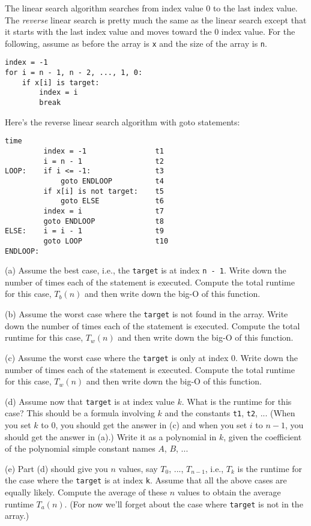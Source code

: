 The linear search algorithm searches from index value 0 to the
last index value.
The \textit{reverse} linear search is pretty much the same as the linear
search except that it starts with the last index value and moves
toward the 0 index value.
For the following, assume as before the array is \verb!x!
and the size of the array is \verb!n!. 
\begin{Verbatim}[frame=single, fontsize=\footnotesize]
index = -1
for i = n - 1, n - 2, ..., 1, 0:
    if x[i] is target:
        index = i
        break
\end{Verbatim}
Here's the reverse linear search algorithm with goto statements:
\begin{Verbatim}[frame=single, fontsize=\footnotesize]
                                   time      
         index = -1                t1     
         i = n - 1                 t2     
LOOP:    if i <= -1:               t3      
             goto ENDLOOP          t4     
         if x[i] is not target:    t5        
             goto ELSE             t6      
         index = i                 t7     
         goto ENDLOOP              t8     
ELSE:    i = i - 1                 t9     
         goto LOOP                 t10    
ENDLOOP:
\end{Verbatim}

(a) Assume the best case, i.e., the \verb!target! is at index 
\verb!n - 1!.
Write down the number of times each of the statement is executed.
Compute the total runtime for this case, $T_b(n)$ and then
write down the big-O of this function.

(b) Assume the worst case where the \verb!target! is not found in the 
array.
Write down the number of times each of the statement is executed.
Compute the total runtime for this case, $T_w(n)$ and then
write down the big-O of this function.

(c) Assume the worst case where the \verb!target! is only at index 0.
Write down the number of times each of the statement is executed.
Compute the total runtime for this case, $T_w(n)$ and then
write down the big-O of this function.

(d) Assume now that \verb!target! is at index value $k$.
What is the runtime for this case? 
This should be a formula involving $k$ and the constants 
\verb!t1!, \verb!t2!, ...
(When you set $k$ to $0$, you should get the answer in (c)
and when you set $i$ to $n - 1$, you should get the answer in (a).)
Write it as a polynomial in $k$, given the coefficient of the polynomial
simple constant names $A$, $B$, ...

(e) Part (d) should give you $n$ values, say $T_0$, ..., $T_{n-1}$,
i.e., $T_k$ is the runtime for the case where the \verb!target! is at index 
\verb!k!.
Assume that all the above cases are equally likely.
Compute the average of these $n$ values to obtain
the average runtime $T_a(n)$.
(For now we'll forget about the case where \verb!target! is not in the array.)
